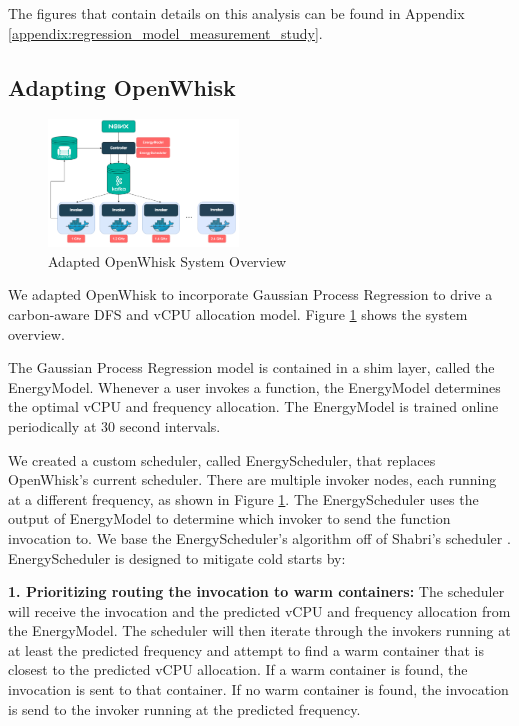 \documentclass[times, 10pt,twocolumn]{article}
\begin{document}
The figures that contain details on this analysis can be found in Appendix \ref{appendix:regression_model_measurement_study}.


\subsection{Adapting OpenWhisk}

\begin{figure}[ht]
   \centering
   \includegraphics[width=0.45\textwidth]{imgs/Adapted_OW_System_Overview.png}
   \caption{Adapted OpenWhisk System Overview}
   \label{fig:adapted_ow_system_overview}
 \end{figure}

We adapted OpenWhisk to incorporate Gaussian Process Regression to drive a carbon-aware DFS and vCPU allocation model. Figure \ref{fig:adapted_ow_system_overview} shows the system overview.

The Gaussian Process Regression model is contained in a shim layer, called the EnergyModel. Whenever a user invokes a function, the EnergyModel determines the optimal vCPU and frequency allocation. The EnergyModel is trained online periodically at 30 second intervals.

We created a custom scheduler, called EnergyScheduler, that replaces OpenWhisk's current scheduler. There are multiple invoker nodes, each running at a different frequency, as shown in Figure \ref{fig:adapted_ow_system_overview}. The EnergyScheduler uses the output of EnergyModel to determine which invoker to send the function invocation to. We base the EnergyScheduler's algorithm off of Shabri's scheduler \cite{sinha2024shabari}. EnergyScheduler is designed to mitigate cold starts by:

\textbf{1. Prioritizing routing the invocation to warm containers: } The scheduler will receive the invocation and the predicted vCPU and frequency allocation from the EnergyModel. The scheduler will then iterate through the invokers running at at least the predicted frequency and attempt to find a warm container that is closest to the predicted vCPU allocation. If a warm container is found, the invocation is sent to that container. If no warm container is found, the invocation is send to the invoker running at the predicted frequency.
\end{document}
